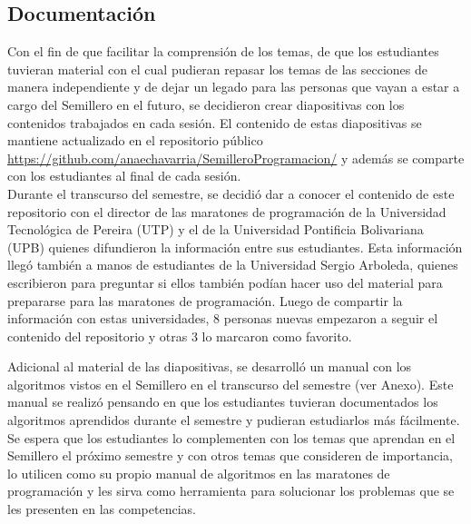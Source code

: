 \documentclass[conference]{IEEEtran}
\begin{document}
\subsection{Documentación}
Con el fin de que facilitar la comprensión de los temas, de que los estudiantes tuvieran material con el cual pudieran repasar los temas de las secciones de manera independiente y de dejar un legado para las personas que vayan a estar a cargo del Semillero en el futuro, se decidieron crear diapositivas con los contenidos trabajados en cada sesión. El contenido de estas diapositivas se mantiene actualizado en el repositorio público \url{https://github.com/anaechavarria/SemilleroProgramacion/} y además se comparte con los estudiantes al final de cada sesión.\\
Durante el transcurso del semestre, se decidió dar a conocer el contenido de este repositorio con el director de las maratones de programación de la Universidad Tecnológica de Pereira (UTP) y el de la Universidad Pontificia Bolivariana (UPB) quienes difundieron la información entre sus estudiantes. Esta información llegó también a manos de estudiantes de la Universidad Sergio Arboleda, quienes escribieron para preguntar si ellos también podían hacer uso del material para prepararse para las maratones de programación. Luego de compartir la información con estas universidades, 8 personas nuevas empezaron a seguir el contenido del repositorio y otras 3 lo marcaron como favorito.

Adicional al material de las diapositivas, se desarrolló un manual con los algoritmos vistos en el Semillero en el transcurso del semestre (ver Anexo). Este manual se realizó pensando en que los estudiantes tuvieran documentados los algoritmos aprendidos durante el semestre y pudieran estudiarlos más fácilmente. Se espera que los estudiantes lo complementen con los temas que aprendan en el Semillero el próximo semestre y con otros temas que consideren de importancia, lo utilicen como su propio manual de algoritmos en las maratones de programación y les sirva como herramienta para solucionar los problemas que se les presenten en las competencias.
\end{document}
